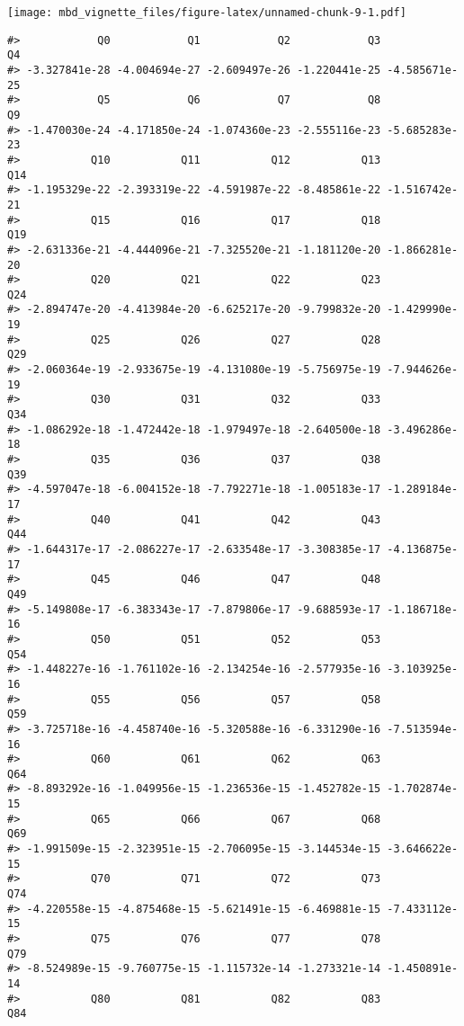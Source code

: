 \documentclass[]{article}
\begin{document}
\texttt{[image: mbd\_vignette\_files/figure-latex/unnamed-chunk-9-1.pdf]}

\begin{verbatim}
#>            Q0            Q1            Q2            Q3            Q4 
#> -3.327841e-28 -4.004694e-27 -2.609497e-26 -1.220441e-25 -4.585671e-25 
#>            Q5            Q6            Q7            Q8            Q9 
#> -1.470030e-24 -4.171850e-24 -1.074360e-23 -2.555116e-23 -5.685283e-23 
#>           Q10           Q11           Q12           Q13           Q14 
#> -1.195329e-22 -2.393319e-22 -4.591987e-22 -8.485861e-22 -1.516742e-21 
#>           Q15           Q16           Q17           Q18           Q19 
#> -2.631336e-21 -4.444096e-21 -7.325520e-21 -1.181120e-20 -1.866281e-20 
#>           Q20           Q21           Q22           Q23           Q24 
#> -2.894747e-20 -4.413984e-20 -6.625217e-20 -9.799832e-20 -1.429990e-19 
#>           Q25           Q26           Q27           Q28           Q29 
#> -2.060364e-19 -2.933675e-19 -4.131080e-19 -5.756975e-19 -7.944626e-19 
#>           Q30           Q31           Q32           Q33           Q34 
#> -1.086292e-18 -1.472442e-18 -1.979497e-18 -2.640500e-18 -3.496286e-18 
#>           Q35           Q36           Q37           Q38           Q39 
#> -4.597047e-18 -6.004152e-18 -7.792271e-18 -1.005183e-17 -1.289184e-17 
#>           Q40           Q41           Q42           Q43           Q44 
#> -1.644317e-17 -2.086227e-17 -2.633548e-17 -3.308385e-17 -4.136875e-17 
#>           Q45           Q46           Q47           Q48           Q49 
#> -5.149808e-17 -6.383343e-17 -7.879806e-17 -9.688593e-17 -1.186718e-16 
#>           Q50           Q51           Q52           Q53           Q54 
#> -1.448227e-16 -1.761102e-16 -2.134254e-16 -2.577935e-16 -3.103925e-16 
#>           Q55           Q56           Q57           Q58           Q59 
#> -3.725718e-16 -4.458740e-16 -5.320588e-16 -6.331290e-16 -7.513594e-16 
#>           Q60           Q61           Q62           Q63           Q64 
#> -8.893292e-16 -1.049956e-15 -1.236536e-15 -1.452782e-15 -1.702874e-15 
#>           Q65           Q66           Q67           Q68           Q69 
#> -1.991509e-15 -2.323951e-15 -2.706095e-15 -3.144534e-15 -3.646622e-15 
#>           Q70           Q71           Q72           Q73           Q74 
#> -4.220558e-15 -4.875468e-15 -5.621491e-15 -6.469881e-15 -7.433112e-15 
#>           Q75           Q76           Q77           Q78           Q79 
#> -8.524989e-15 -9.760775e-15 -1.115732e-14 -1.273321e-14 -1.450891e-14 
#>           Q80           Q81           Q82           Q83           Q84 

\end{verbatim}
\end{document}
